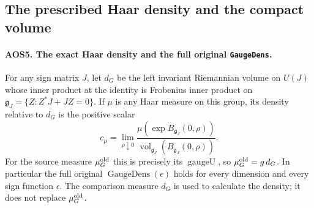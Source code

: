 \documentclass[11pt,a4paper]{article}
\numberwithin{equation}{section}
\theoremstyle{remark}\newtheorem{remark}[theorem]{Remark}
\begin{document}
\subsection{The prescribed Haar density and the compact volume}

\paragraph{AOS5. The exact Haar density and the full original \texttt{Gauge\allowbreak Dens}.}
\label{claim:AOS5}
For any sign matrix $J$, let $d_G$ be the left invariant Riemannian
volume on $U(J)$ whose inner product at the identity is Frobenius
inner product on
$\mathfrak g_J=\{Z:Z^*J+JZ=0\}$.  If $\mu$ is any Haar measure
on this group, its density relative to $d_G$ is the positive scalar
\[
       c_\mu=\lim_{\rho\downarrow0}
          \frac{\mu(\exp B_{\mathfrak g_J}(0,\rho))}
               {\operatorname{vol}_{\mathfrak g_J}
                    (B_{\mathfrak g_J}(0,\rho))}.
 \tag{AOS.17}
\]
For the source measure $\mu_G^{\rm old}$ this is precisely its
$\operatorname{gaugeU}$, so $\mu_G^{\rm old}=g\,d_G$.
In particular the full original $\operatorname{GaugeDens}(\epsilon)$
holds for every dimension and every sign function $\epsilon$.
The comparison measure $d_G$ is used
to calculate the density; it does not replace $\mu_G^{\rm old}$.
\end{document}
